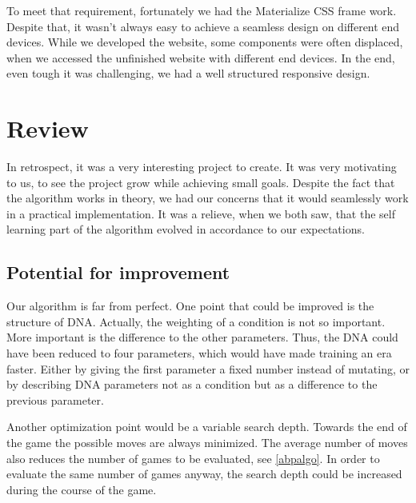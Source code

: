 To meet that requirement, fortunately we had the Materialize CSS frame work. Despite that, it wasn't always easy to achieve a seamless design on different end devices. While we developed the website, some components were often displaced, when we accessed the unfinished website with different end devices. 
In the end, even tough it was challenging, we had a well structured responsive design.

\section{Review}
In retrospect, it was a very interesting project to create. It was very motivating to us, to see the project grow while achieving small goals. Despite the fact that the algorithm works in theory, we had our concerns that it would seamlessly work in a practical implementation. It was a relieve, when we both saw, that the self learning part of the algorithm evolved in accordance to our expectations.

\subsection{Potential for improvement}
Our algorithm is far from perfect. One point that could be improved is the structure of DNA. Actually, the weighting of a condition is not so important. More important is the difference to the other parameters. Thus, the DNA could have been reduced to four parameters, which would have made training an era faster. Either by giving the first parameter a fixed number instead of mutating, or by describing DNA parameters not as a condition but as a difference to the previous parameter.

Another optimization point would be a variable search depth. Towards the end of the game the possible moves are always minimized. The average number of moves also reduces the number of games to be evaluated, see \autoref{abpalgo}. In order to evaluate the same number of games anyway, the search depth could be increased during the course of the game.
